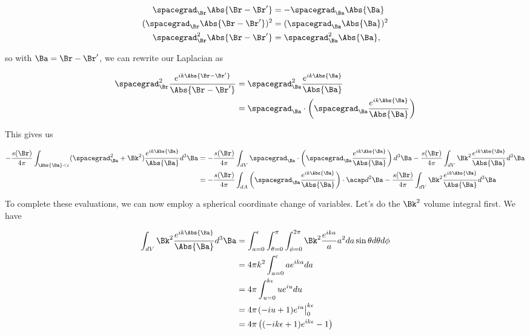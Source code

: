 \begin{align*}
\spacegrad_\Br \Abs{\Br - \Br'} &= -\spacegrad_\Ba \Abs{\Ba} \\
(\spacegrad_\Br \Abs{\Br - \Br'})^2 &= (\spacegrad_\Ba \Abs{\Ba})^2 \\
\spacegrad_\Br^2 \Abs{\Br - \Br'} &= \spacegrad_\Ba^2 \Abs{\Ba},
\end{align*}

so with $\Ba = \Br - \Br'$, we can rewrite our Laplacian as

\begin{align*}
\spacegrad_\Br^2 \frac{e^{i k \Abs{\Br - \Br'}}}{\Abs{\Br - \Br'}} 
&= 
\spacegrad_\Ba^2 \frac{e^{i k \Abs{\Ba}}}{\Abs{\Ba}}  \\
&= 
\spacegrad_\Ba \cdot \left(\spacegrad_\Ba \frac{e^{i k \Abs{\Ba}}}{\Abs{\Ba}} \right)
\end{align*}

This gives us

\begin{align*}
-\frac{s(\Br)}{4\pi} 
\int_{\Abs{\Ba} < \epsilon} (\spacegrad_\Ba^2 + \Bk^2) \frac{e^{i k \Abs{\Ba}}}{\Abs{\Ba}} d^3 \Ba 
&=
-\frac{s(\Br)}{4\pi} 
\int_{dV} \spacegrad_\Ba \cdot \left( \spacegrad_\Ba \frac{e^{i k \Abs{\Ba}}}{\Abs{\Ba}} \right) d^3 \Ba 
-\frac{s(\Br)}{4\pi} \int_{dV}
\Bk^2 \frac{e^{i k \Abs{\Ba}}}{\Abs{\Ba}} d^3 \Ba  \\
&=
-\frac{s(\Br)}{4\pi} 
\int_{dA} \left( \spacegrad_\Ba \frac{e^{i k \Abs{\Ba}}}{\Abs{\Ba}} \right) \cdot \acap d^2 \Ba 
-\frac{s(\Br)}{4\pi} 
\int_{dV}
\Bk^2 \frac{e^{i k \Abs{\Ba}}}{\Abs{\Ba}} d^3 \Ba 
\end{align*}

To complete these evaluations, we can now employ a spherical coordinate change of variables.  Let's do the $\Bk^2$ volume integral first.  We have

\begin{align*}
\int_{dV}
\Bk^2 \frac{e^{i k \Abs{\Ba}}}{\Abs{\Ba}} d^3 \Ba 
&=
\int_{a = 0}^\epsilon \int_{\theta = 0}^\pi \int_{\phi=0}^{2\pi}
\Bk^2 \frac{e^{i k a}}{a} a^2 da \sin\theta d\theta d\phi \\
&=
4\pi k^2
\int_{a = 0}^\epsilon 
a e^{i k a} da  \\
&=
4\pi 
\int_{u = 0}^{k\epsilon}
u e^{i u} du  \\
&=
4\pi 
{\left.
(-i u + 1) e^{i u} \right\vert}_0^{k \epsilon} \\
&=
4 \pi \left( (-i k \epsilon + 1)e^{i k \epsilon} - 1 \right)
\end{align*}


